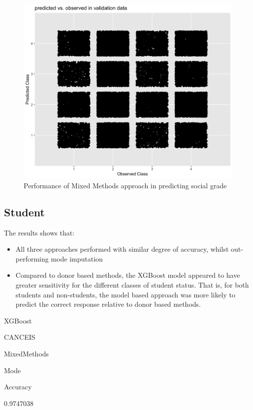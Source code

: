 \documentclass[]{book}
\providecommand{\tightlist}{%
  \setlength{\itemsep}{0pt}\setlength{\parskip}{0pt}}
\begin{document}
\begin{figure}
\centering
\includegraphics{images/SGCANCEISXGqplot.png}
\caption{Performance of Mixed Methods approach in predicting social
grade}
\end{figure}

\subsection{Student}\label{student}

The results shows that:

\begin{itemize}
\tightlist
\item
  All three approaches performed with similar degree of accuracy, whilst
  out-performing mode imputation\\
\item
  Compared to donor based methods, the XGBoost model appeared to have
  greater sensitivity for the different classes of student status. That
  is, for both students and non-students, the model based approach was
  more likely to predict the correct response relative to donor based
  methods.
\end{itemize}

XGBoost

CANCEIS

MixedMethods

Mode

Accuracy

0.9747038
\end{document}
